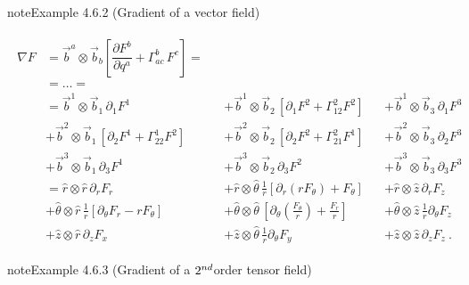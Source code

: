 \documentclass[letterpaper,10pt,english]{jupyterBook}
\begin{document}
\begin{sphinxadmonition}{note}{Example 4.6.2 (Gradient of a vector field)}




\begin{equation*}
\begin{split}\begin{aligned}
  \nabla F 
  & = \vec{b}^a \otimes \vec{b}_b \left[ \dfrac{\partial F^b}{\partial q^a} + \Gamma_{ac}^b \, F^c \right] = \\
  & = \dots = \\
  & =  \vec{b}^1 \otimes \vec{b}_1 \, \partial_1 F^1 
  && + \vec{b}^1 \otimes \vec{b}_2 \, \left[ \partial_1 F^2 + \Gamma_{12}^2 F^2 \right]
  && + \vec{b}^1 \otimes \vec{b}_3 \, \partial_1 F^3 \\
  &  + \vec{b}^2 \otimes \vec{b}_1 \, \left[ \partial_2 F^1 + \Gamma_{22}^1 F^2 \right]
  && + \vec{b}^2 \otimes \vec{b}_2 \, \left[ \partial_2 F^2 + \Gamma_{21}^2 F^1 \right]
  && + \vec{b}^2 \otimes \vec{b}_3 \, \partial_2 F^3 \\
  &  + \vec{b}^3 \otimes \vec{b}_1 \, \partial_3 F^1 
  && + \vec{b}^3 \otimes \vec{b}_2 \, \partial_3 F^2 
  && + \vec{b}^3 \otimes \vec{b}_3 \, \partial_3 F^3 \\
  &  = \hat{r     } \otimes \hat{r     } \, \partial_r F_r   
  && + \hat{r     } \otimes \hat{\theta} \, \frac{1}{r} \left[ \partial_r (r F_{\theta}) + F_{\theta} \right]
  && + \hat{r     } \otimes \hat{z     } \, \partial_r F_z \\
  &  + \hat{\theta} \otimes \hat{r     } \, \frac{1}{r} \left[ \partial_\theta F_r - r F_{\theta} \right]
  && + \hat{\theta} \otimes \hat{\theta} \, \left[ \partial_\theta \left( \frac{F_\theta}{r} \right) + \frac{F_r}{r} \right]
  && + \hat{\theta} \otimes \hat{z     } \, \frac{1}{r} \partial_{\theta} F_z \\
  &  + \hat{z     } \otimes \hat{r     } \, \partial_z F_x   
  && + \hat{z     } \otimes \hat{\theta} \, \frac{1}{r} \partial_\theta F_y   
  && + \hat{z     } \otimes \hat{z     } \, \partial_z F_z \ .
\end{aligned}\end{split}
\end{equation*}\end{sphinxadmonition}
\label{ch/tensor-algebra-calculus/calculus-euclidean-cylindrical:example-2}
\begin{sphinxadmonition}{note}{Example 4.6.3 (Gradient of a \protect\(2^{nd}\protect\)\sphinxhyphen{}order tensor field)}


\end{sphinxadmonition}
\end{document}

